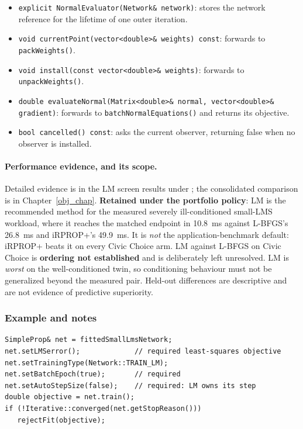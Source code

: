 \begin{itemize}
\item \texttt{explicit NormalEvaluator(Network\& network)}: stores the network
      reference for the lifetime of one outer iteration.
\item \texttt{void currentPoint(vector<double>\& weights) const}: forwards to
      \texttt{packWeights()}.
\item \texttt{void install(const vector<double>\& weights)}: forwards to
      \texttt{unpackWeights()}.
\item \texttt{double evaluateNormal(Matrix<double>\& normal,
      vector<double>\& gradient)}: forwards to
      \texttt{batchNormalEquations()} and returns its objective.
\item \texttt{bool cancelled() const}: asks the current observer, returning
      false when no observer is installed.
\end{itemize}

\paragraph{Performance evidence, and its scope.}  Detailed evidence is in the
LM screen results under ; the consolidated
comparison is in Chapter~\ref{obj_chap}.  {\bf Retained under the portfolio policy}:
LM is the recommended method for the measured severely ill-conditioned small-LMS
workload, where it reaches the matched endpoint in 10.8~ms against L-BFGS's
26.8~ms and iRPROP+'s 49.9~ms.  It is {\em not} the application-benchmark
default: iRPROP+ beats it on every Civic Choice arm.  LM against L-BFGS on Civic
Choice is {\bf ordering not established} and is deliberately left unresolved.  LM
is {\em worst} on the well-conditioned twin, so conditioning behaviour must not be
generalized beyond the measured pair.  Held-out differences are descriptive and
are not evidence of predictive superiority.

\subsubsection{Example and notes}
\begin{verbatim}
SimpleProp& net = fittedSmallLmsNetwork;
net.setLMSerror();             // required least-squares objective
net.setTrainingType(Network::TRAIN_LM);
net.setBatchEpoch(true);       // required
net.setAutoStepSize(false);    // required: LM owns its step
double objective = net.train();
if (!Iterative::converged(net.getStopReason()))
   rejectFit(objective);
\end{verbatim}

